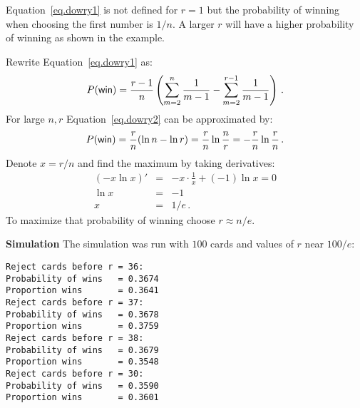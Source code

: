 Equation~\ref{eq.dowry1} is not defined for $r=1$ but the probability of winning when choosing the first number is $1/n$. A larger $r$ will have a higher probability of winning as shown in the example.

Rewrite Equation~\ref{eq.dowry1} as:
\begin{equation}\label{eq.dowry2}
P(\textsf{win}) =\displaystyle\frac{r-1}{n}\left(\sum_{m=2}^{n} \displaystyle\frac{1}{m-1}-\sum_{m=2}^{r-1} \displaystyle\frac{1}{m-1}\right)\,.
\end{equation}
For large $n,r$ Equation~\ref{eq.dowry2} can be approximated by:
\[
P(\textsf{win})=\displaystyle\frac{r}{n}(\ln n - \ln r)=\displaystyle\frac{r}{n}\ln \displaystyle\frac{n}{r}=-\displaystyle\frac{r}{n}\ln \displaystyle\frac{r}{n}\,.
\]
Denote $x=r/n$ and find the maximum by taking derivatives:
\begin{eqnarray*}
(-x\ln x)' &=& -x\cdot \frac{1}{x} + (-1) \ln x=0\\
\ln x &=& -1\\
x &=& 1/e\,.
\end{eqnarray*}
To maximize that probability of winning choose $r \approx n/e$.

\textbf{Simulation}
The simulation was run with $100$ cards and values of $r$ near $100/e$:
\begin{verbatim}
Reject cards before r = 36:
Probability of wins   = 0.3674
Proportion wins       = 0.3641
Reject cards before r = 37:
Probability of wins   = 0.3678
Proportion wins       = 0.3759
Reject cards before r = 38:
Probability of wins   = 0.3679
Proportion wins       = 0.3548
Reject cards before r = 30:
Probability of wins   = 0.3590
Proportion wins       = 0.3601
\end{verbatim}


